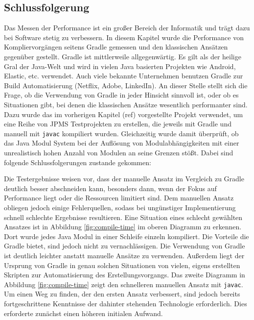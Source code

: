 \subsection{Schlussfolgerung}

Das Messen der Performance ist ein großer Bereich der Informatik und trägt dazu bei Software stetig zu verbessern.
In diesem Kapitel wurde die Performance von Kompliervorgängen seitens Gradle gemessen und den klassischen Ansätzen gegenüber gestellt.
Gradle ist mittlerweile allgegenwärtig. Es gilt als der heilige Gral der Java-Welt und wird in vielen Java basierten Projekten wie Android, Elastic, etc. verwendet. Auch viele bekannte Unternehmen benutzen Gradle zur Build Automatisierung (Netflix, Adobe, LinkedIn).
An dieser Stelle stellt sich die Frage, ob die Verwendung von Gradle in jeder Hinsicht sinnvoll ist, oder ob es Situationen gibt, bei denen die klassischen Ansätze wesentlich performanter sind.
Dazu wurde das im vorherigen Kapitel (ref) vorgestellte Projekt verwendet, um eine Reihe von JPMS Testprojekten zu erstellen, die jeweils mit Gradle und manuell mit \texttt{javac} kompiliert wurden. Gleichzeitig wurde damit überprüft, ob das Java Modul System bei der Auflösung von Modulabhängigkeiten mit einer unrealistisch hohen Anzahl von Modulen an seine Grenzen stößt.
Dabei sind folgende Schlussfolgerungen zustande gekommen:

Die Testergebnisse weisen vor, dass der manuelle Ansatz im Vergleich zu Gradle deutlich besser abschneiden kann, besonders dann, wenn der Fokus auf Performance liegt oder die Ressourcen limitiert sind.
Dem manuellen Ansatz obliegen jedoch einige Fehlerquellen, sodass bei ungünstiger Implementierung schnell schlechte Ergebnisse resultieren. 
Eine Situation eines schlecht gewählten Ansatzes ist in Abbildung \ref{fig:compile-time} im oberen Diagramm zu erkennen. Dort wurde jedes Java Modul in einer Schleife einzeln kompiliert.
Die Vorteile die Gradle bietet, sind jedoch nicht zu vernachlässigen.
Die Verwendung von Gradle ist deutlich leichter anstatt manuelle Ansätze zu verwenden. Außerdem liegt der Ursprung von Gradle in genau solchen Situationen von vielen, eigens erstellten Skripten zur Automatisierung des Erstellungsvorgangs.
Das zweite Diagramm in Abbildung \ref{fig:compile-time} zeigt den schnelleren manuellen Ansatz mit \texttt{javac}. Um einen Weg zu finden, der den ersten Ansatz verbessert, sind jedoch bereits fortgeschrittene Kenntnisse der dahinter stehenden Technologie erforderlich. Dies erforderte zunächst einen höheren initialen Aufwand.

